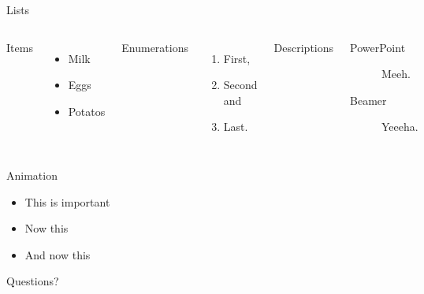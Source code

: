 \documentclass[10pt, dvipsnames]{beamer}
\begin{document}
\begin{frame}{Lists}
  \begin{columns}[T,onlytextwidth]
      Items
      \begin{itemize}
        \item Milk \item Eggs \item Potatos
      \end{itemize}

      Enumerations
      \begin{enumerate}
        \item First, \item Second and \item Last.
      \end{enumerate}

      Descriptions
      \begin{description}
        \item[PowerPoint] Meeh. \item[Beamer] Yeeeha.
      \end{description}
  \end{columns}
\end{frame}
\begin{frame}{Animation}
  \begin{itemize}[<+- | alert@+>]
    \item \alert<4>{This is important}
    \item Now this
    \item And now this
  \end{itemize}
\end{frame}

{
\begin{frame}[standout]
  Questions?
\end{frame}
}
\end{document}
